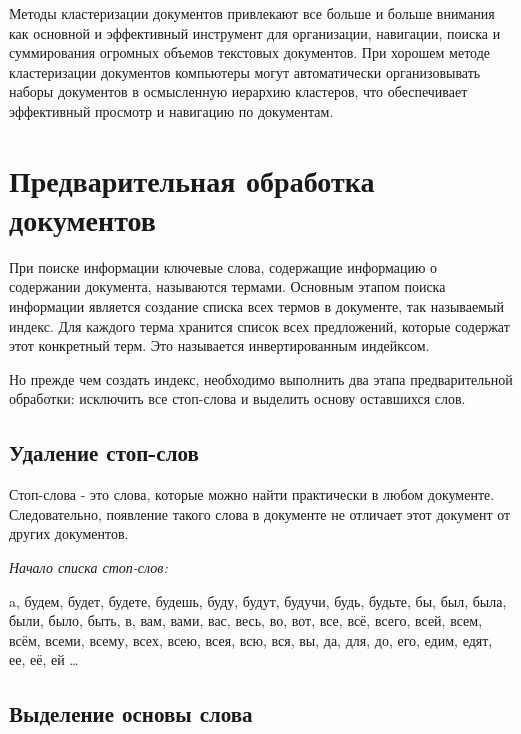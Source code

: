 Методы кластеризации документов привлекают все больше и больше внимания
как основной и эффективный инструмент для организации, навигации, поиска и суммирования огромных объемов текстовых документов.
При хорошем методе кластеризации документов компьютеры могут автоматически организовывать наборы документов в осмысленную иерархию кластеров,
что обеспечивает эффективный просмотр и навигацию по документам.





\newpage





\section{Предварительная обработка документов}

При поиске информации ключевые слова,
содержащие информацию о содержании документа, называются термами.
Основным этапом поиска информации является создание списка всех термов в документе, так называемый индекс.
Для каждого терма хранится список всех предложений, которые содержат этот конкретный терм.
Это называется инвертированным индейксом.

Но прежде чем создать индекс, необходимо выполнить два этапа предварительной обработки: исключить все стоп-слова и выделить основу оставшихся слов.



\subsection{Удаление стоп-слов}

Стоп-слова - это слова, которые можно найти практически в любом документе.
Следовательно, появление такого слова в документе не отличает этот документ от других документов.

\textit{Начало списка стоп-слов:}

a, будем, будет, будете, будешь, буду, будут, будучи, будь, будьте, бы,
был, была, были, было, быть, в, вам, вами, вас, весь, во, вот, все, всё,
всего, всей, всем, всём, всеми, всему, всех, всею, всея, всю, вся, вы,
да, для, до, его, едим, едят, ее, её, ей \ldots



\subsection{Выделение основы слова}

